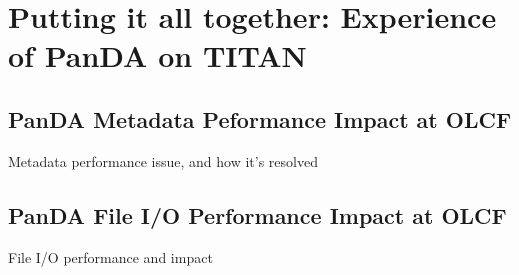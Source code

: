 \section{Putting it all together: Experience of PanDA on TITAN} %
\label{sec:panda_titan}

\subsection{PanDA Metadata Peformance Impact at OLCF}

Metadata performance issue, and how it’s resolved


\subsection{PanDA File I/O Performance Impact at OLCF}

File I/O performance and impact




